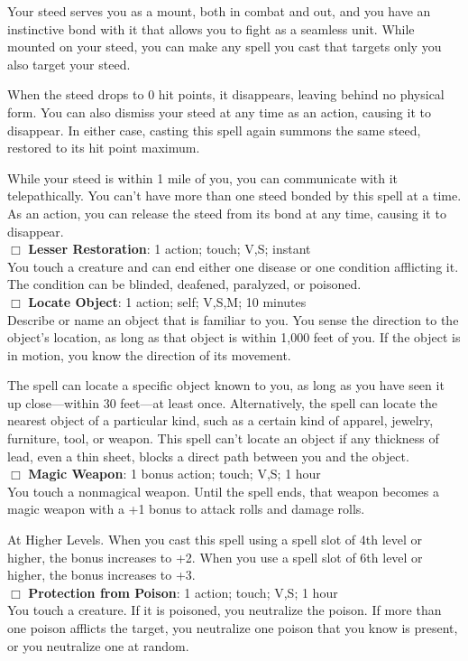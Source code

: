 \documentclass[11pt]{article}
\newcommand{\spell}[1]{{\sc\bfseries #1}}
\begin{document}
{Your steed serves you as a mount, both in combat and out, and you have
an instinctive bond with it that allows you to fight as a seamless
unit. While mounted on your steed, you can make any spell you cast
that targets only you also target your steed.

When the steed drops to 0 hit points, it disappears, leaving behind no
physical form. You can also dismiss your steed at any time as an
action, causing it to disappear. In either case, casting this spell
again summons the same steed, restored to its hit point maximum.

While your steed is within 1 mile of you, you can communicate with it
telepathically.  You can’t have more than one steed bonded by this
spell at a time. As an action, you can release the steed from its bond
at any time, causing it to disappear.
\\[4pt]
$\Box$ \spell{Lesser Restoration}: 1 action; touch; V,S; instant
\\
You touch a creature and can end either one disease or one condition
afflicting it. The condition can be blinded, deafened, paralyzed, or
poisoned.
\\[4pt]
$\Box$ \spell{Locate Object}: 1 action; self; V,S,M; 10 minutes
\\
Describe or name an object that is familiar to you. You sense the
direction to the object’s location, as long as that object is within
1,000 feet of you. If the object is in motion, you know the direction
of its movement.

The spell can locate a specific object known to you, as long as you
have seen it up close—within 30 feet—at least once. Alternatively, the
spell can locate the nearest object of a particular kind, such as a
certain kind of apparel, jewelry, furniture, tool, or weapon.  This
spell can’t locate an object if any thickness of lead, even a thin
sheet, blocks a direct path between you and the object.
\\[4pt]
$\Box$ \spell{Magic Weapon}:  1 bonus action; touch; V,S; 1 hour
\\
You touch a nonmagical weapon. Until the spell ends, that weapon becomes a magic weapon with a +1 bonus to attack rolls and damage rolls.

At Higher Levels. When you cast this spell using a spell slot of 4th
level or higher, the bonus increases to +2. When you use a spell slot
of 6th level or higher, the bonus increases to +3.
\\[4pt]
$\Box$ \spell{Protection from Poison}: 1 action; touch; V,S; 1 hour
\\
You touch a creature. If it is poisoned, you neutralize the poison. If
more than one poison afflicts the target, you neutralize one poison
that you know is present, or you neutralize one at random.

}
\end{document}

